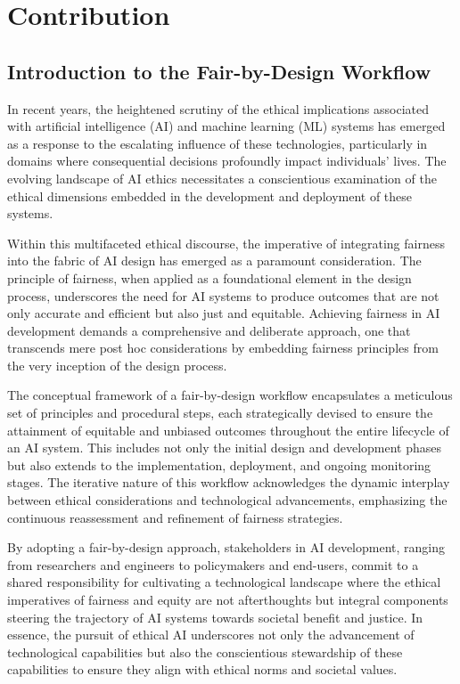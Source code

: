 \chapter{Contribution} %
\label{chap:contribution}

\section{Introduction to the Fair-by-Design Workflow}
\label{section:workflow-introduction}

In recent years, the heightened scrutiny of the ethical implications associated with artificial intelligence (AI) and machine learning (ML) systems has emerged as a response to the escalating influence of these technologies, particularly in domains where consequential decisions profoundly impact individuals' lives. The evolving landscape of AI ethics necessitates a conscientious examination of the ethical dimensions embedded in the development and deployment of these systems.

Within this multifaceted ethical discourse, the imperative of integrating fairness into the fabric of AI design has emerged as a paramount consideration. The principle of fairness, when applied as a foundational element in the design process, underscores the need for AI systems to produce outcomes that are not only accurate and efficient but also just and equitable. Achieving fairness in AI development demands a comprehensive and deliberate approach, one that transcends mere post hoc considerations by embedding fairness principles from the very inception of the design process.

The conceptual framework of a fair-by-design workflow encapsulates a meticulous set of principles and procedural steps, each strategically devised to ensure the attainment of equitable and unbiased outcomes throughout the entire lifecycle of an AI system. This includes not only the initial design and development phases but also extends to the implementation, deployment, and ongoing monitoring stages. The iterative nature of this workflow acknowledges the dynamic interplay between ethical considerations and technological advancements, emphasizing the continuous reassessment and refinement of fairness strategies.

By adopting a fair-by-design approach, stakeholders in AI development, ranging from researchers and engineers to policymakers and end-users, commit to a shared responsibility for cultivating a technological landscape where the ethical imperatives of fairness and equity are not afterthoughts but integral components steering the trajectory of AI systems towards societal benefit and justice. In essence, the pursuit of ethical AI underscores not only the advancement of technological capabilities but also the conscientious stewardship of these capabilities to ensure they align with ethical norms and societal values.

